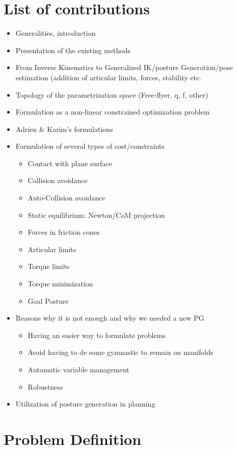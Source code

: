 \section{List of contributions}
\begin{itemize}
  \item Generalities, introduction
  \item Presentation of the existing methods
  \item From Inverse Kinematics to Generalized IK/posture Generation/pose estimation (addition of articular limits, forces, stability etc.
  \item Topology of the parametrization space (Free-flyer, q, f, other)
  \item Formulation as a non-linear constrained optimization problem
  \item Adrien \& Karim's formulations
  \item Formulation of several types of cost/constraints
  \begin{itemize}
    \item Contact with plane surface
    \item Collision avoidance
    \item Auto-Collision avoidance
    \item Static equilibrium: Newton/CoM projection
    \item Forces in friction cones
    \item Articular limits
    \item Torque limits
    \item Torque minimization
    \item Goal Posture
  \end{itemize}
  \item Reasons why it is not enough and why we needed a new PG
    \begin{itemize}
      \item Having an easier way to formulate problems
      \item Avoid having to de some gymnastic to remain on manifolds
      \item Automatic variable management
      \item Robustness
    \end{itemize}
  \item Utilization of posture generation in planning
\end{itemize}

\section{Problem Definition}
\label{sec:problem_definition}

